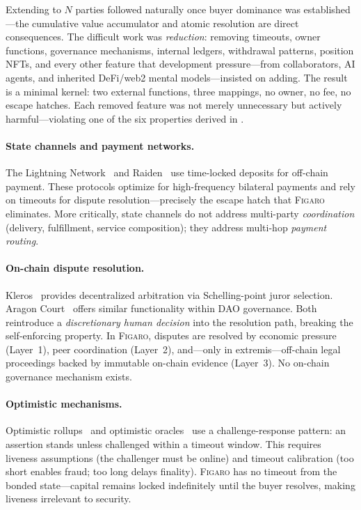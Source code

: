 \documentclass[11pt,a4paper]{article}
\theoremstyle{definition}
\theoremstyle{remark}
\newcommand{\figaro}{\textsc{Figaro}}
\begin{document}
Extending to $N$ parties followed naturally once buyer dominance was
established---the cumulative value accumulator and atomic resolution
are direct consequences. The difficult work was \emph{reduction}:
removing timeouts, owner functions, governance mechanisms, internal
ledgers, withdrawal patterns, position NFTs, and every other feature
that development pressure---from collaborators, AI agents, and
inherited DeFi/web2 mental models---insisted on adding. The result is
a minimal kernel: two external functions, three mappings, no owner, no
fee, no escape hatches. Each removed feature was not merely unnecessary
but actively harmful---violating one of the six properties derived in
.

\paragraph{State channels and payment networks.}
The Lightning Network~\citep{poon2016} and Raiden~\citep{raiden2017} use
time-locked deposits for off-chain payment. These protocols optimize for
high-frequency bilateral payments and rely on timeouts for dispute
resolution---precisely the escape hatch that \figaro{} eliminates. More
critically, state channels do not address multi-party \emph{coordination}
(delivery, fulfillment, service composition); they address multi-hop
\emph{payment routing}.

\paragraph{On-chain dispute resolution.}
Kleros~\citep{kleros2019} provides decentralized arbitration via
Schelling-point juror selection. Aragon Court~\citep{aragon2017} offers
similar functionality within DAO governance. Both reintroduce a
\emph{discretionary human decision} into the resolution path, breaking
the self-enforcing property. In \figaro{}, disputes are resolved by
economic pressure (Layer~1), peer coordination (Layer~2), and---only in
extremis---off-chain legal proceedings backed by immutable on-chain
evidence (Layer~3). No on-chain governance mechanism exists.

\paragraph{Optimistic mechanisms.}
Optimistic rollups~\citep{optimism2021} and optimistic
oracles~\citep{uma2020} use a challenge-response pattern: an assertion
stands unless challenged within a timeout window. This requires
liveness assumptions (the challenger must be online) and
timeout calibration (too short enables fraud; too long delays
finality). \figaro{} has no timeout from the bonded state---capital
remains locked indefinitely until the buyer resolves, making liveness
irrelevant to security.
\end{document}
